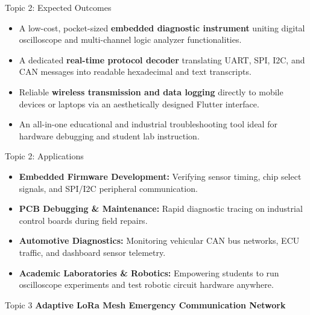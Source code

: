 \documentclass{beamer}
\begin{document}
\begin{frame}{Topic 2: Expected Outcomes}
\begin{itemize}
  \item A low-cost, pocket-sized \textbf{embedded diagnostic instrument} uniting digital oscilloscope and multi-channel logic analyzer functionalities.
  \vspace{0.3cm}
  \item A dedicated \textbf{real-time protocol decoder} translating UART, SPI, I2C, and CAN messages into readable hexadecimal and text transcripts.
  \vspace{0.3cm}
  \item Reliable \textbf{wireless transmission and data logging} directly to mobile devices or laptops via an aesthetically designed Flutter interface.
  \vspace{0.3cm}
  \item An all-in-one educational and industrial troubleshooting tool ideal for hardware debugging and student lab instruction.
\end{itemize}
\end{frame}

\begin{frame}{Topic 2: Applications}
\begin{itemize}
  \item \textbf{Embedded Firmware Development:} Verifying sensor timing, chip select signals, and SPI/I2C peripheral communication.
  \vspace{0.3cm}
  \item \textbf{PCB Debugging \& Maintenance:} Rapid diagnostic tracing on industrial control boards during field repairs.
  \vspace{0.3cm}
  \item \textbf{Automotive Diagnostics:} Monitoring vehicular CAN bus networks, ECU traffic, and dashboard sensor telemetry.
  \vspace{0.3cm}
  \item \textbf{Academic Laboratories \& Robotics:} Empowering students to run oscilloscope experiments and test robotic circuit hardware anywhere.
\end{itemize}
\end{frame}

\begin{frame}
  \begin{block}{\centering \huge Topic 3}
    \vspace{0.3cm}
    \centering \Large \textbf{Adaptive LoRa Mesh Emergency Communication Network}
    \vspace{0.3cm}
  \end{block}
\end{frame}
\end{document}
